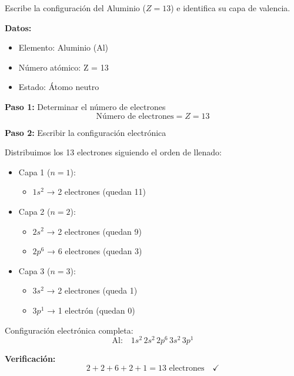 \begin{exercise}
    Escribe la configuración del Aluminio (\( Z = 13 \)) e identifica su capa de valencia.
    \begin{solu}
        \textbf{Datos:}
        \begin{itemize}
            \item Elemento: Aluminio (Al)
            \item Número atómico: Z = 13
            \item Estado: Átomo neutro
        \end{itemize}

        \textbf{Paso 1:} Determinar el número de electrones
        \[
            \text{Número de electrones} = Z = 13
        \]

        \textbf{Paso 2:} Escribir la configuración electrónica

        Distribuimos los 13 electrones siguiendo el orden de llenado:
        \begin{itemize}
            \item Capa 1 (\(n = 1\)):
            \begin{itemize}
                \item \(1s^2\) → 2 electrones (quedan 11)
            \end{itemize}
            \item Capa 2 (\(n = 2\)):
            \begin{itemize}
                \item \(2s^2\) → 2 electrones (quedan 9)
                \item \(2p^6\) → 6 electrones (quedan 3)
            \end{itemize}
            \item Capa 3 (\(n = 3\)):
            \begin{itemize}
                \item \(3s^2\) → 2 electrones (queda 1)
                \item \(3p^1\) → 1 electrón (quedan 0)
            \end{itemize}
        \end{itemize}

        Configuración electrónica completa:
        \[
            \text{Al:} \quad 1s^2 \, 2s^2 \, 2p^6 \, 3s^2 \, 3p^1
        \]

        \textbf{Verificación:}
        \[
            2 + 2 + 6 + 2 + 1 = 13 \text{ electrones} \quad \checkmark
        \]


\end{solu}
\end{exercise}
